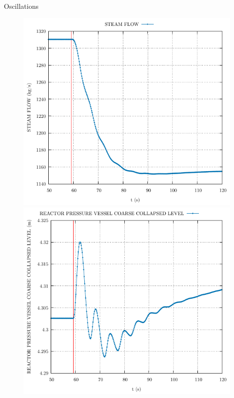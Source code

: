 \begin{frame}{Oscillations}
	\begin{figure}
		\centering
		\begin{minipage}{.5\textwidth}
			\centering
			\includegraphics[width=0.7\linewidth]{./graphs/STEAM FLOW_comp.pdf}
		\end{minipage}%
		\begin{minipage}{.5\textwidth}
			\centering
			\includegraphics[width=0.7\linewidth]{./graphs/REACTOR PRESSURE VESSEL COARSE COLLAPSED LEVEL_comp.pdf}
		\end{minipage}
	\end{figure}
		\vspace{-10pt}
		\begin{figure}
				\centering
				\begin{minipage}{.5\textwidth}
						\centering

\end{minipage}
\end{figure}
\end{frame}

